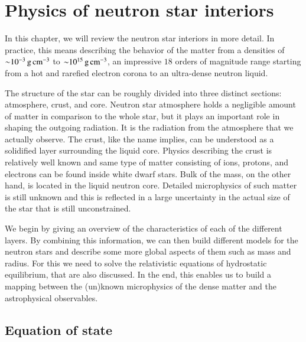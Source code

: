 \chapter{Physics of neutron star interiors} 

In this chapter, we will review the neutron star interiors in more detail.
In practice, this means describing the behavior of the matter from a densities of $\mathord{\sim} 10^{-3} \, \mathrm{g}\,\mathrm{cm}^{-3}$ to $\mathord{\sim} 10^{15} \, \mathrm{g}\,\mathrm{cm}^{-3}$, an impressive $18$ orders of magnitude range starting from a hot and rarefied electron corona to an ultra-dense neutron liquid.

The structure of the star can be roughly divided into three distinct sections: atmosphere, crust, and core.
Neutron star atmosphere holds a negligible amount of matter in comparison to the whole star, but it plays an important role in shaping the outgoing radiation.
It is the radiation from the atmosphere that we actually observe.
The crust, like the name implies, can be understood as a solidified layer surrounding the liquid core.
Physics describing the crust is relatively well known and same type of matter consisting of ions, protons, and electrons can be found inside white dwarf stars.
Bulk of the mass, on the other hand, is located in the liquid neutron core.
Detailed microphysics of such matter is still unknown and this is reflected in a large uncertainty in the actual size of the star that is still unconstrained.

We begin by giving an overview of the characteristics of each of the different layers.
By combining this information, we can then build different models for the neutron stars and describe some more global aspects of them such as mass and radius.
For this we need to solve the relativistic equations of hydrostatic equilibrium, that are also discussed.
In the end, this enables us to build a mapping between the (un)known microphysics of the dense matter and the astrophysical observables.


\section{Equation of state}
%
%
%
%

